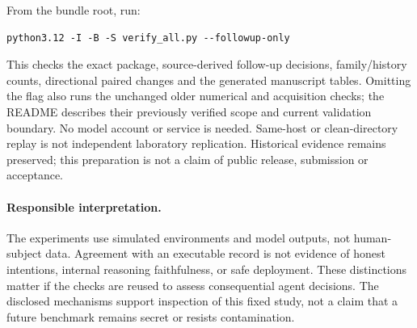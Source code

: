 From the bundle root, run:
\begin{verbatim}
python3.12 -I -B -S verify_all.py --followup-only
\end{verbatim}
This
checks the exact package, source-derived follow-up decisions, family/history
counts, directional paired changes and the generated manuscript tables. Omitting the flag also runs
the unchanged older numerical and acquisition checks; the README describes
their previously verified scope and current validation boundary. No model account or service is needed. Same-host or clean-directory
replay is not independent laboratory replication. Historical evidence remains
preserved; this preparation is not a claim of public release, submission or
acceptance.


\paragraph{Responsible interpretation.}
The experiments use simulated environments and model outputs, not human-subject
data. Agreement with an executable record is not evidence of honest intentions,
internal reasoning faithfulness, or safe deployment. These distinctions matter
if the checks are reused to assess consequential agent decisions. The disclosed
mechanisms support inspection of this fixed study, not a claim that a future
benchmark remains secret or resists contamination.
